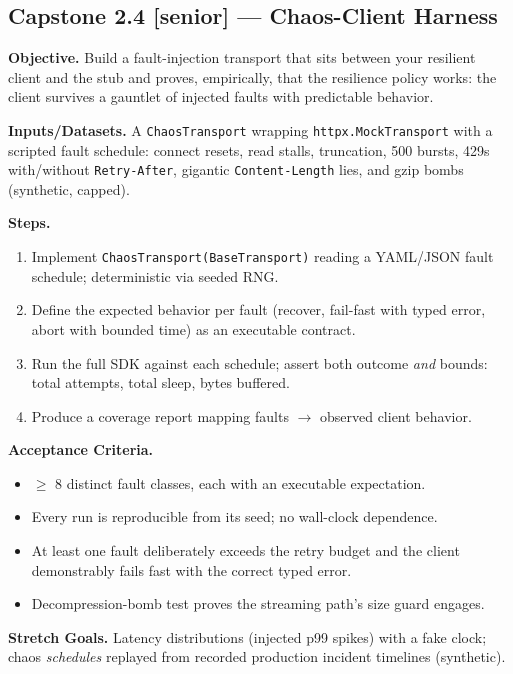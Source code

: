 \subsection{Capstone 2.4 [senior] --- Chaos-Client Harness}

\textbf{Objective.} Build a fault-injection transport that sits between your
resilient client and the stub and proves, empirically, that the resilience
policy works: the client survives a gauntlet of injected faults with
predictable behavior.

\textbf{Inputs/Datasets.} A \texttt{ChaosTransport} wrapping
\texttt{httpx.MockTransport} with a scripted fault schedule: connect resets,
read stalls, truncation, 500 bursts, 429s with/without \texttt{Retry-After},
gigantic \texttt{Content-Length} lies, and gzip bombs (synthetic, capped).

\textbf{Steps.}
\begin{enumerate}
  \item Implement \texttt{ChaosTransport(BaseTransport)} reading a YAML/JSON
        fault schedule; deterministic via seeded RNG.
  \item Define the expected behavior per fault (recover, fail-fast with
        typed error, abort with bounded time) as an executable contract.
  \item Run the full SDK against each schedule; assert both outcome
        \emph{and} bounds: total attempts, total sleep, bytes buffered.
  \item Produce a coverage report mapping faults $\rightarrow$ observed
        client behavior.
\end{enumerate}

\textbf{Acceptance Criteria.}
\begin{itemize}
  \item[$\square$] $\ge$ 8 distinct fault classes, each with an executable
        expectation.
  \item[$\square$] Every run is reproducible from its seed; no wall-clock
        dependence.
  \item[$\square$] At least one fault deliberately exceeds the retry budget
        and the client demonstrably fails fast with the correct typed error.
  \item[$\square$] Decompression-bomb test proves the streaming path's size
        guard engages.
\end{itemize}

\textbf{Stretch Goals.} Latency distributions (injected p99 spikes) with a
fake clock; chaos \emph{schedules} replayed from recorded production incident
timelines (synthetic).

